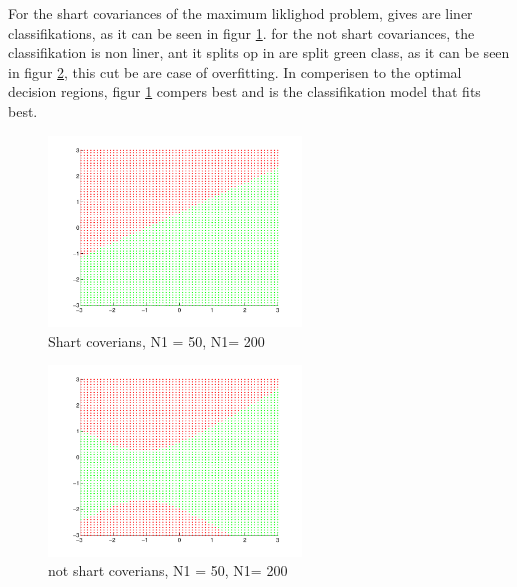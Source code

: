 For the shart covariances of the maximum liklighod problem, gives are
liner classifikations, as it can be seen in figur \ref{fig:q24a}. for
the not shart covariances, the classifikation is non liner, ant it
splits op in are split green class, as it can be seen in figur
\ref{fig:q24b}, this cut be are case of overfitting. In comperisen to
the optimal decision regions, figur \ref{fig:q24a} compers best and is
the classifikation model that fits best.

\begin{figure}[!htbp]
  \centering
  \includegraphics[width=0.6\textwidth]{./images/q24a.pdf}
  \caption{Shart coverians, N1 = 50, N1= 200}
  \label{fig:q24a}
\end{figure}

\begin{figure}[!htbp]
  \centering
  \includegraphics[width=0.6\textwidth]{./images/q24b.pdf}
  \caption{not shart coverians, N1 = 50, N1= 200}
  \label{fig:q24b}
\end{figure}
